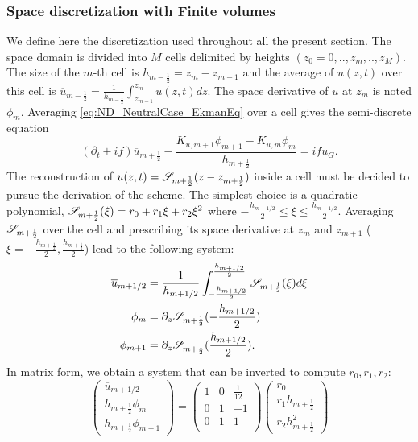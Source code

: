 \subsubsection{Space discretization with Finite volumes}
We define here the discretization used throughout all the present
section. The space domain is divided into $M$ cells delimited by
heights $(z_0=0, .., z_m, .., z_M)$. The size of the $m$-th cell
is $h_{m-\frac{1}{2}}=z_{m}-z_{m-1}$ and the average of $u(z, t)$
over this cell is 
$\overline{u}_{m-\frac{1}{2}}=\frac{1} {h_{m-\frac{1}{2}}}
\int_{z_{m-1}}^{z_m}u(z, t)dz$.
The space derivative of $u$ at $z_m$ is noted $\phi_{m}$.
Averaging \eqref{eq:ND_NeutralCase_EkmanEq} over a cell gives
the semi-discrete equation
\begin{equation}
\label{eq:ND_NeutralCase_semiDiscreteEkmanEq}
	(\partial_t + if) \overline{u}_{m+\frac{1}{2}} - 
	\frac{K_{u, m+1} \phi_{m+1} - K_{u, m} \phi_{m}}
		{h_{m+\frac{1}{2}}} = i f u_G.
\end{equation}
The reconstruction of $u(z, t) = {\cal S}_{m+\frac{1}{2}}
				(z - z_{m+\frac{1}{2}})$
				inside a cell must be decided
to pursue the derivation of the scheme. The simplest choice is
a quadratic polynomial,
${\cal S}_{m+\frac{1}{2}}(\xi) = r_0 + r_1 \xi + r_2 \xi^2$ where
$-\frac{h_{m+1/2}}{2} \leq \xi \leq \frac{h_{m+1/2}}{2}$.
Averaging ${\cal S}_{m+\frac{1}{2}}$ over the cell and
prescribing its space derivative at $z_{m}$ and $z_{m+1}$
($\xi=-\frac{h_{m+\frac{1}{2}}}{2}, \frac{h_{m+\frac{1}{2}}}{2}$)
lead to the following system:
\begin{equation}
	\begin{aligned}
		\overline{u}_{m+1/2} &= \frac{1}{h_{m+1/2}}
		\int_{-\frac{h_{m+1/2}}{2}}^{\frac{h_{m+1/2}}{2}}
		{\cal S}_{m+\frac{1}{2}}(\xi)d\xi\\
		\phi_m &= \partial_z {\cal S}_{m+\frac{1}{2}}
		(-\frac{h_{m+1/2}}{2})\\
		\phi_{m+1} &=
		\partial_z {\cal S}_{m+\frac{1}{2}}
		(\frac{h_{m+1/2}}{2}).
	\end{aligned}
\end{equation}
In matrix form, we obtain a system that can be inverted to
compute $r_0, r_1, r_2$:
\begin{equation}
    \begin{pmatrix}
    \overline{u}_{m+1/2} \\
    h_{m+\frac{1}{2}} \phi_m \\
	    h_{m+\frac{1}{2}} \phi_{m+1}
    \end{pmatrix} = 
    \begin{pmatrix}
    1 & 0 & \frac{1}{12} \\
    0 & 1 & -1 \\
    0 & 1 & 1 \\
    \end{pmatrix}
    \begin{pmatrix}
    r_0 \\
    r_1 h_{m+\frac{1}{2}} \\
    r_2 h_{m+\frac{1}{2}}^2
    \end{pmatrix}
\end{equation}
